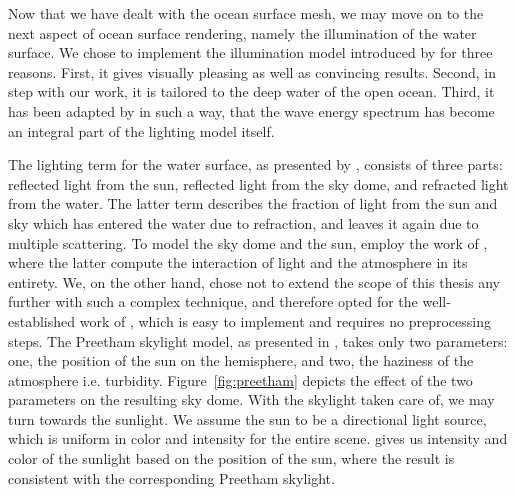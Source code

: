 %
Now that we have dealt with the ocean surface mesh, we may move on to the next
aspect of ocean surface rendering, namely the illumination of the water surface.
We chose to implement the illumination model introduced by
\citet{article:oceanlighting} for three reasons. First, it gives visually
pleasing as well as convincing results. Second, in step with our work,
it is tailored to the deep water of the open ocean. Third, it has been adapted by
\citet{misc:oceanlightingfft} in such a way, that the wave energy spectrum has
become an integral part of the lighting model itself.

The lighting term for the water surface, as presented by
\citeauthor{article:oceanlighting}, consists of three parts:
reflected light from the sun, reflected light from the sky dome, and refracted
light from the water. The latter term describes the fraction of light from
the sun and sky which has entered the water due to refraction, and leaves it
again due to multiple scattering.
To model the sky dome and the sun, \citeauthor{article:oceanlighting} employ the
work of \citet{Bruneton:2008}, where the latter compute the interaction of
light and the atmosphere in its entirety. We, on the other hand, chose not to
extend the scope of this thesis any further with such a complex technique, and
therefore opted for the well-established work of \citet{Preetham:1999}, which
is easy to implement and requires no preprocessing steps.
The Preetham skylight model, as presented in \citet[Section 3.1]{Preetham:1999},
takes only two parameters: one, the position of the sun on the hemisphere, and two,
the haziness of the atmosphere i.e. turbidity.
Figure~\ref{fig:preetham} depicts the effect of the two parameters on
the resulting sky dome.
With the skylight taken care of, we may turn towards the sunlight. We assume
the sun to be a directional light source, which is uniform in color and
intensity for the entire scene. \citet[Section 3.2]{Preetham:1999} gives us
intensity and color of the sunlight based on the position of the sun, where
the result is consistent with the corresponding Preetham skylight.
